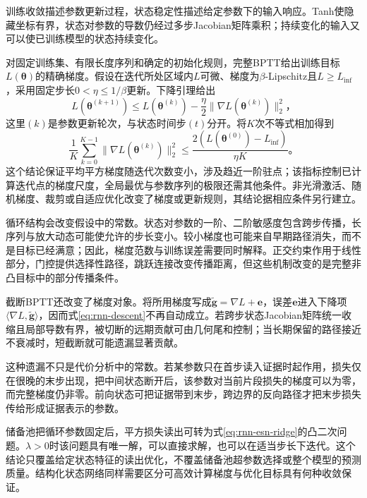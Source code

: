 训练收敛描述参数更新过程，状态稳定性描述给定参数下的输入响应。Tanh使隐藏坐标有界，状态对参数的导数仍经过多步Jacobian矩阵乘积；持续变化的输入又可以使已训练模型的状态持续变化。

对固定训练集、有限长度序列和确定的初始化规则，完整BPTT给出训练目标$L(\bm{\theta})$的精确梯度。假设在迭代所处区域内$L$可微、梯度为$\beta$-Lipschitz且$L\geq L_{\inf}$，采用固定步长$0<\eta\leq1/\beta$更新。下降引理给出
\begin{equation}
  L(\bm{\theta}^{(k+1)})
    \leq L(\bm{\theta}^{(k)})
       -\frac{\eta}{2}\lVert\nabla L(\bm{\theta}^{(k)})\rVert_2^2\text{，}
  \label{eq:rnn-descent}
\end{equation}
这里$(k)$是参数更新轮次，与状态时间步$(t)$分开。将$K$次不等式相加得到
\begin{equation}
  \frac{1}{K}\sum_{k=0}^{K-1}
     \lVert\nabla L(\bm{\theta}^{(k)})\rVert_2^2
     \leq\frac{2\left(L(\bm{\theta}^{(0)})-L_{\inf}\right)}{\eta K}\text{。}
  \label{eq:rnn-stationarity}
\end{equation}
这个结论保证平均平方梯度随迭代次数变小，涉及趋近一阶驻点；该指标控制已计算迭代点的梯度尺度，全局最优与参数序列的极限还需其他条件。非光滑激活、随机梯度、裁剪或自适应优化改变了梯度或更新规则，其结论据相应条件另行建立。

循环结构会改变假设中的常数。状态对参数的一阶、二阶敏感度包含跨步传播，长序列与放大动态可能使允许的步长变小。较小梯度也可能来自早期路径消失，而不是目标已经满意；因此，梯度范数与训练误差需要同时解释。正交约束作用于线性部分，门控提供选择性路径，跳跃连接改变传播距离，但这些机制改变的是完整非凸目标中的部分传播条件。

截断BPTT还改变了梯度对象。将所用梯度写成$\widetilde{\bm{g}}=\nabla L+\bm{e}$，误差$\bm{e}$进入下降项$\langle\nabla L,\widetilde{\bm{g}}\rangle$，因而式\eqref{eq:rnn-descent}不再自动成立。若跨步状态Jacobian矩阵统一收缩且局部导数有界，被切断的远期贡献可由几何尾和控制；当长期保留的路径接近不衰减时，短截断就可能遗漏显著贡献。

这种遗漏不只是代价分析中的常数。若某参数只在首步读入证据时起作用，损失仅在很晚的末步出现，把中间状态断开后，该参数对当前片段损失的梯度可以为零，而完整梯度仍非零。前向状态可把证据带到末步，跨边界的反向路径才把末步损失传给形成证据表示的参数。

储备池把循环参数固定后，平方损失读出可转为式\eqref{eq:rnn-esn-ridge}的凸二次问题。$\lambda>0$时该问题具有唯一解，可以直接求解，也可以在适当步长下迭代。这个结论只覆盖给定状态特征的读出优化，不覆盖储备池超参数选择或整个模型的预测质量。结构化状态网络同样需要区分可高效计算梯度与优化目标具有何种收敛保证。

